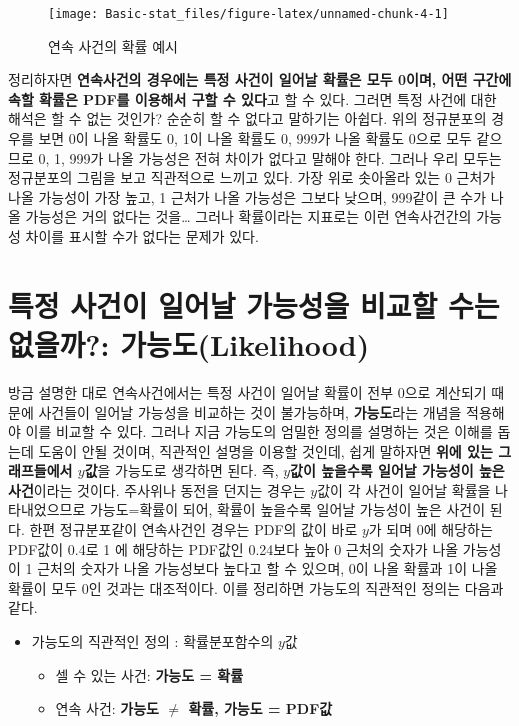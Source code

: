 \documentclass[]{book}
\providecommand{\tightlist}{%
  \setlength{\itemsep}{0pt}\setlength{\parskip}{0pt}}
\begin{document}
\begin{figure}

{\centering \texttt{[image: Basic-stat\_files/figure-latex/unnamed-chunk-4-1]} 

}

\caption{연속 사건의 확률 예시}\label{fig:unnamed-chunk-4}
\end{figure}

정리하자면 \textbf{연속사건의 경우에는 특정 사건이 일어날 확률은 모두
0이며, 어떤 구간에 속할 확률은 PDF를 이용해서 구할 수 있다}고 할 수
있다. 그러면 특정 사건에 대한 해석은 할 수 없는 것인가? 순순히 할 수
없다고 말하기는 아쉽다. 위의 정규분포의 경우를 보면 0이 나올 확률도 0,
1이 나올 확률도 0, 999가 나올 확률도 0으로 모두 같으므로 0, 1, 999가
나올 가능성은 전혀 차이가 없다고 말해야 한다. 그러나 우리 모두는
정규분포의 그림을 보고 직관적으로 느끼고 있다. 가장 위로 솟아올라 있는 0
근처가 나올 가능성이 가장 높고, 1 근처가 나올 가능성은 그보다 낮으며,
999같이 큰 수가 나올 가능성은 거의 없다는 것을\ldots{} 그러나 확률이라는
지표로는 이런 연속사건간의 가능성 차이를 표시할 수가 없다는 문제가 있다.

\section{특정 사건이 일어날 가능성을 비교할 수는 없을까?:
가능도(Likelihood)}\label{uxd2b9uxc815-uxc0acuxac74uxc774-uxc77cuxc5b4uxb0a0-uxac00uxb2a5uxc131uxc744-uxbe44uxad50uxd560-uxc218uxb294-uxc5c6uxc744uxae4c-uxac00uxb2a5uxb3c4likelihood}

방금 설명한 대로 연속사건에서는 특정 사건이 일어날 확률이 전부 0으로
계산되기 때문에 사건들이 일어날 가능성을 비교하는 것이 불가능하며,
\textbf{가능도}라는 개념을 적용해야 이를 비교할 수 있다. 그러나 지금
가능도의 엄밀한 정의를 설명하는 것은 이해를 돕는데 도움이 안될 것이며,
직관적인 설명을 이용할 것인데, 쉽게 말하자면 \textbf{위에 있는
그래프들에서 \(y\)값}을 가능도로 생각하면 된다. 즉, \textbf{\(y\)값이
높을수록 일어날 가능성이 높은 사건}이라는 것이다. 주사위나 동전을 던지는
경우는 \(y\)값이 각 사건이 일어날 확률을 나타내었으므로 가능도=확률이
되어, 확률이 높을수록 일어날 가능성이 높은 사건이 된다. 한편
정규분포같이 연속사건인 경우는 PDF의 값이 바로 \(y\)가 되며 0에 해당하는
PDF값이 0.4로 1 에 해당하는 PDF값인 0.24보다 높아 0 근처의 숫자가 나올
가능성이 1 근처의 숫자가 나올 가능성보다 높다고 할 수 있으며, 0이 나올
확률과 1이 나올 확률이 모두 0인 것과는 대조적이다. 이를 정리하면
가능도의 직관적인 정의는 다음과 같다.

\begin{itemize}
\tightlist
\item
  가능도의 직관적인 정의 : 확률분포함수의 \(y\)값

  \begin{itemize}
  \tightlist
  \item
    셀 수 있는 사건: \textbf{가능도 = 확률}
  \item
    연속 사건: \textbf{가능도 \(\neq\) 확률, 가능도 = PDF값}
  \end{itemize}
\end{itemize}
\end{document}
